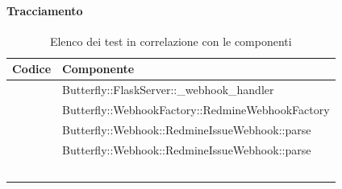     \setcounter{tu}{0}

	\paragraph{Tracciamento} \label{tracciamentounita}

		\begin{table}[H]
			\centering
			{\def\arraystretch{1.4}
			\begin{tabularx}{\textwidth}{YY}
				\textbf{Codice} & \textbf{Componente} \\
				\toprule
				\addtotu & Butterfly::FlaskServer::\_webhook\_handler \\
				\addtotu & Butterfly::WebhookFactory::RedmineWebhookFactory \\
				\addtotu & Butterfly::Webhook::RedmineIssueWebhook::parse \\
				\addtotu & Butterfly::Webhook::RedmineIssueWebhook::parse \\
				\addtotu & \\
				\addtotu &  \\
				\addtotu & \\
				\addtotu & \\
				\bottomrule\\
			\end{tabularx}}
			\caption{Elenco dei test in correlazione con le componenti}
		\end{table}
